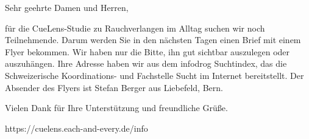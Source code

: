 \vspace{1em}
Sehr geehrte Damen und Herren,

für die CueLens-Studie zu Rauchverlangen im Alltag suchen wir noch Teilnehmende. Darum werden
Sie in den nächsten Tagen einen Brief mit einem Flyer bekommen. Wir haben nur die Bitte, ihn gut
sichtbar auszulegen oder auszuhängen. Ihre Adresse haben wir aus dem infodrog Suchtindex, das die
Schweizerische Koordinations- und Fachstelle Sucht im Internet bereitstellt. Der Absender des Flyers
ist Stefan Berger aus Liebefeld, Bern.

Vielen Dank für Ihre Unterstützung und freundliche Grüße.

https://cuelens.each-and-every.de/info

\newpage
